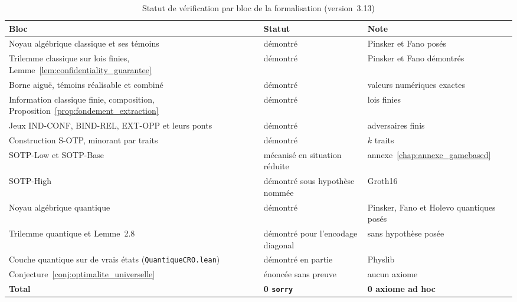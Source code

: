 \begin{table}[htbp]
\centering
\caption{Statut de v\'erification par bloc de la formalisation (version~3.13)}
\label{tab:lean4_status}
\footnotesize
\begin{tabular}{@{}p{7.4cm}p{3.4cm}p{3.2cm}@{}}
\toprule
\textbf{Bloc} & \textbf{Statut} & \textbf{Note} \\
\midrule
Noyau alg\'ebrique classique et ses t\'emoins & d\'emontr\'e & Pinsker et Fano pos\'es \\
Trilemme classique sur lois finies, Lemme~\ref{lem:confidentiality_guarantee} & d\'emontr\'e & Pinsker et Fano d\'emontr\'es \\
Borne aigu\"e, t\'emoins r\'ealisable et combin\'e & d\'emontr\'e & valeurs num\'eriques exactes \\
Information classique finie, composition, Proposition~\ref{prop:fondement_extraction} & d\'emontr\'e & lois finies \\
Jeux IND-CONF, BIND-REL, EXT-OPP et leurs ponts & d\'emontr\'e & adversaires finis \\
Construction S-OTP, minorant par traits & d\'emontr\'e & $k$ traits \\
SOTP-Low et SOTP-Base & m\'ecanis\'e en situation r\'eduite & annexe~\ref{chap:annexe_gamebased} \\
SOTP-High & d\'emontr\'e sous hypoth\`ese nomm\'ee & Groth16 \\
Noyau alg\'ebrique quantique & d\'emontr\'e & Pinsker, Fano et Holevo quantiques pos\'es \\
Trilemme quantique et Lemme~2.8 & d\'emontr\'e pour l'encodage diagonal & sans hypoth\`ese pos\'ee \\
Couche quantique sur de vrais \'etats (\texttt{QuantiqueCRO.lean}) & d\'emontr\'e en partie & Physlib \\
Conjecture~\ref{conj:optimalite_universelle} & \'enonc\'ee sans preuve & aucun axiome \\
\midrule
\textbf{Total} & \textbf{0 \texttt{sorry}} & \textbf{0 axiome ad hoc} \\
\bottomrule
\end{tabular}
\end{table}

